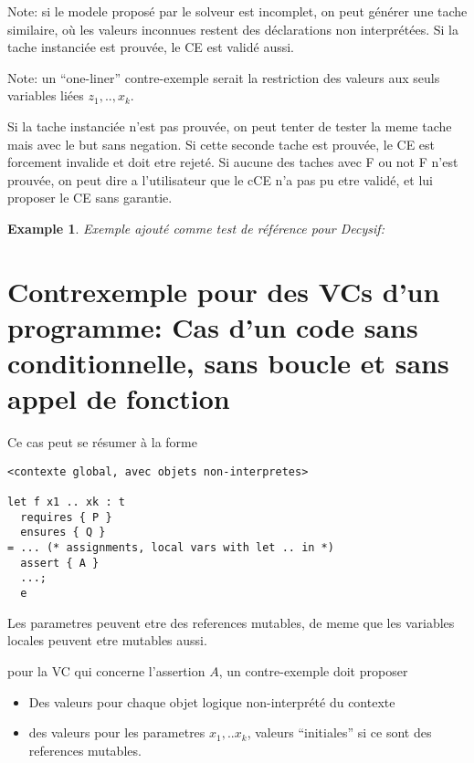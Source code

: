 \documentclass[a4paper,twoside]{article}
\newtheorem{example}[definition]{Example}
\begin{document}
Note: si le modele proposé par le solveur est incomplet, on peut générer une
tache similaire, où les valeurs inconnues restent des déclarations non
interprétées. Si la tache instanciée est prouvée, le CE est validé aussi.

Note: un ``one-liner'' contre-exemple serait la restriction des valeurs aux
seuls variables liées $z_1,..,x_k$.

Si la tache instanciée n'est pas prouvée, on peut tenter de tester la meme tache
mais avec le but sans negation. Si cette seconde tache est prouvée, le CE est
forcement invalide et doit etre rejeté. Si aucune des taches avec F ou not F
n'est prouvée, on peut dire a l'utilisateur que le cCE n'a pas pu etre validé,
et lui proposer le CE sans garantie.


\begin{example}
Exemple ajouté comme test de référence pour Decysif:


\end{example}

\section{Contrexemple pour des VCs d'un programme: Cas d'un code sans conditionnelle, sans boucle et sans appel de fonction}

Ce cas peut se résumer à la forme

\begin{lstlisting}
<contexte global, avec objets non-interpretes>

let f x1 .. xk : t
  requires { P }
  ensures { Q }
= ... (* assignments, local vars with let .. in *)
  assert { A }
  ...;
  e
\end{lstlisting}
Les parametres peuvent etre des references mutables, de meme que les variables
locales peuvent etre mutables aussi.

pour la VC qui concerne l'assertion $A$, un contre-exemple doit proposer
\begin{itemize}
\item Des valeurs pour chaque objet logique non-interprété du contexte
\item des valeurs pour les parametres $x_1,..x_k$, valeurs ``initiales'' si ce
  sont des references mutables.
\end{itemize}
\end{document}
